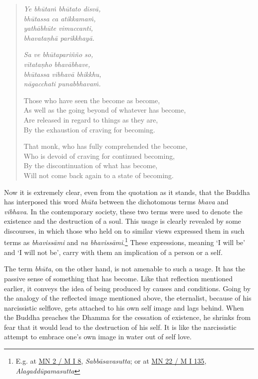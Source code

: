 \begin{quote}
\emph{Ye bhūtaṁ bhūtato disvā,}\\
\emph{bhūtassa ca atikkamaṁ,}\\
\emph{yathābhūte vimuccanti,}\\
\emph{bhavataṇhā parikkhayā.}

\emph{Sa ve bhūtapariñño so,}\\
\emph{vītataṇho bhavābhave,}\\
\emph{bhūtassa vibhavā bhikkhu,}\\
\emph{nāgacchati punabbhavaṁ.}

Those who have seen the become as become,\\
As well as the going beyond of whatever has become,\\
Are released in regard to things as they are,\\
By the exhaustion of craving for becoming.

\clearpage

That monk, who has fully comprehended the become,\\
Who is devoid of craving for continued becoming,\\
By the discontinuation of what has become,\\
Will not come back again to a state of becoming.
\end{quote}

Now it is extremely clear, even from the quotation as it stands, that the Buddha has interposed this word \emph{bhūta} between the dichotomous terms \emph{bhava} and \emph{vibhava}. In the contemporary society, these two terms were used to denote the existence and the destruction of a soul. This usage is clearly revealed by some discourses, in which those who held on to similar views expressed them in such terms as \emph{bhavissāmi} and \emph{na bhavissāmi}.\footnote{E.g. at \href{https://suttacentral.net/mn2/pli/ms}{MN 2 / M I 8}, \emph{Sabbāsavasutta}; or at \href{https://suttacentral.net/mn22/pli/ms}{MN 22 / M I 135}, \emph{Alagaddūpamasutta}} These expressions, meaning `I will be' and `I will not be', carry with them an implication of a person or a self.

The term \emph{bhūta}, on the other hand, is not amenable to such a usage. It has the passive sense of something that has become. Like that reflection mentioned earlier, it conveys the idea of being produced by causes and conditions. Going by the analogy of the reflected image mentioned above, the eternalist, because of his narcissistic selflove, gets attached to his own self image and lags behind. When the Buddha preaches the Dhamma for the cessation of existence, he shrinks from fear that it would lead to the destruction of his self. It is like the narcissistic attempt to embrace one's own image in water out of self love.

